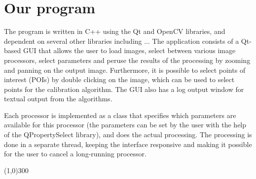 \section{Our program}
\label{sec:prog}
The program is written in C++ using the Qt and OpenCV libraries, and
dependent on several other libraries including ... 
The application consists of a Qt-based GUI that allows the user to load
images, select between various image processors, select parameters and
peruse the results of the processing by zooming and panning on the
output image. Furthermore, it is possible to select points of interest
(POIs) by double clicking on the image, which can be used to select
points for the calibration algorithm. The GUI also has a log output
window for textual output from the algorithms.

Each processor is implemented as a class that specifies which
parameters are available for this processor (the parameters can be set
by the user with the help of the QPropertySelect library), and does
the actual processing. The processing is done in a separate thread, keeping the interface responsive and making it possible for the user to
cancel a long-running processor.





\begin{center}
\line(1,0){300}
\end{center}